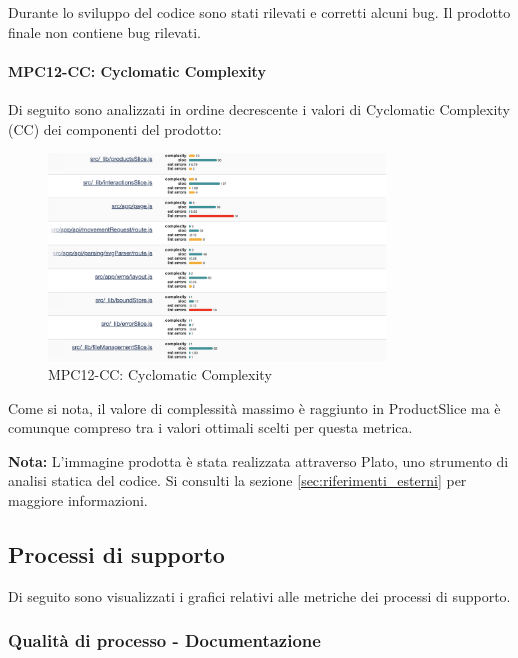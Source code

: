 \noindent Durante lo sviluppo del codice sono stati rilevati e corretti alcuni bug. Il prodotto finale non contiene bug rilevati.

\paragraph{MPC12-CC: Cyclomatic Complexity}

Di seguito sono analizzati in ordine decrescente i valori di Cyclomatic Complexity (CC) dei componenti del prodotto:

\begin{figure}[h!] 
    \centering
    \includegraphics[width=0.8\textwidth]{images/MPC12-CC.png}
    \caption{MPC12-CC: Cyclomatic Complexity}
\end{figure}

\noindent Come si nota, il valore di complessità massimo è raggiunto in ProductSlice ma è comunque compreso tra i valori ottimali scelti per questa metrica.

\vspace{0.2cm}
\textbf{Nota:} L'immagine prodotta è stata realizzata attraverso Plato, uno strumento di analisi statica del codice. Si consulti la sezione \ref{sec:riferimenti_esterni} per maggiore informazioni.

\newpage

\subsection{Processi di supporto} \label{sec:processi_di_supporto}
Di seguito sono visualizzati i grafici relativi alle metriche dei processi di supporto.
\subsubsection{Qualità di processo - Documentazione}

